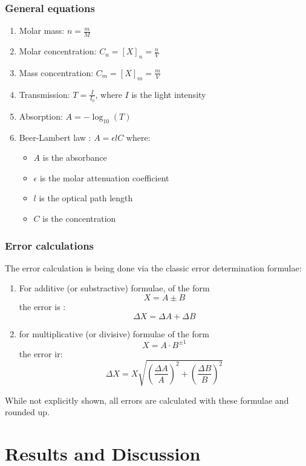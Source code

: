 \documentclass[twocolumn]{article}
\begin{document}
\subsubsection{General equations}
\begin{enumerate}
    \item Molar mass: $n=\frac{m}{M}$
    \item Molar concentration: $C_n=[X]_n= \frac{n}{V}$
    \item Mass concentration: $C_m=[X]_m= \frac{m}{V}$
    \item Transmission: $T = \frac{I}{I_0}$, where $I$ is the light intensity
    \item Absorption: $A = -\log_{10}(T)$
    \item Beer-Lambert law \cite{beerlambert}: $A=\epsilon l C$ where: \begin{itemize}
        \item $A$ is the absorbance
        \item $\epsilon$ is the molar attenuation coefficient
        \item $l$ is the optical path length
        \item $C$ is the concentration
    \end{itemize}
\end{enumerate}
\subsubsection{Error calculations}
The error calculation is being done via the classic error determination formulae:
\begin{enumerate}
    \item For additive (or substractive) formulae, of the form \[ X = A \pm B\] the error is : \[\Delta X = \Delta A + \Delta B\]
    \item for multiplicative (or divisive) formulae of the form \[X = A \cdot  B^{\pm 1}\] the error ir: \[  \Delta X = X\sqrt{\left(\frac{\Delta A}{A}\right)^2+\left(\frac{\Delta B}{B}\right)^2} \]
\end{enumerate}
While not explicitly shown, all errors are calculated with these formulae and rounded up.
\section{Results and Discussion}
\end{document}
